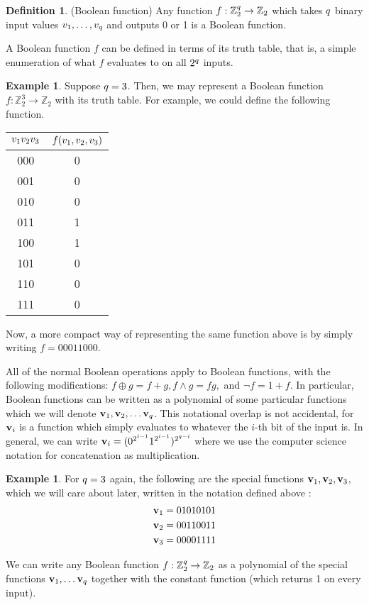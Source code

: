 \documentclass[12pt,twoside]{reedthesis}
\theoremstyle{definition}
\newtheorem{definition}[theorem]{Definition}
\newtheorem{example}[theorem]{Example}
\newlength{\arrow}
\newcommand{\Z}{\mathbb{Z}}
\begin{document}
\begin{definition}(Boolean function) Any function $f: \Z_2^\numin \rightarrow \Z_2$ which takes $q$ binary input values $v_{1}, \ldots, v_{q}$ and outputs 0 or 1 is a Boolean function.
\end{definition}

A Boolean function $f$ can be defined in terms of its truth table, that is, a simple enumeration of what $f$ evaluates to on all $2^q$ inputs.

\begin{example}
Suppose $q = 3$. Then, we may represent a Boolean function $f: \Z_2^3 \rightarrow \Z_2$ with its truth table. For example, we could define the following function.
\begin{center}
\begin{tabular}{ |c|c| } 
 \hline
$ v_{1}v_{2}v_{3}$ &$f(v_{1}, v_{2}, v_{3})$  \\ 
\hline
000 & 0  \\ 
001 & 0 \\
010 & 0 \\
011 & 1\\
100 & 1\\
101 & 0\\
110 & 0\\
111 & 0 \\
 \hline
\end{tabular}
\end{center}
Now, a more compact way of representing the same function above is by simply writing $f = 00011000$. 
\end{example}
All of the normal Boolean operations apply to Boolean functions, with the following modifications: $f \oplus g = f+g, f \land g = fg, $ and $\lnot f = 1 + f$. In particular, Boolean functions can be written as a polynomial of some particular functions which we will denote $\mathbf{v}_{1}, \mathbf{v}_{2}, \ldots \mathbf{v}_{q}$. This notational overlap is not accidental, for $\mathbf{v}_{i}$ is a function which simply evaluates to whatever the $i$-th bit of the input is. In general, we can write $\mathbf{v}_{i} = (0^{2^{i-1}} 1^{2^{i-1}})^{2^{q-i}}$ where we use the computer science notation for concatenation as multiplication.
\begin{example}
For $q = 3$ again, the following are the special functions $\mathbf{v}_{1}, \mathbf{v}_{2}, \mathbf{v}_{3}$, which we will care about later,  written in the notation defined above :
\begin{align*}
& \mathbf{v}_{1} = 01010101 \\
& \mathbf{v}_{2} = 00110011\\
&\mathbf{v}_{3} = 00001111
\end{align*}
\end{example}
We can write any Boolean function $f: \Z_2^\numin \rightarrow \Z_2$ as a polynomial of the special functions $\mathbf{v}_{1}, \ldots \mathbf{v}_{q}$ together with the constant function \consto (which returns 1 on every input).  
\end{document}
